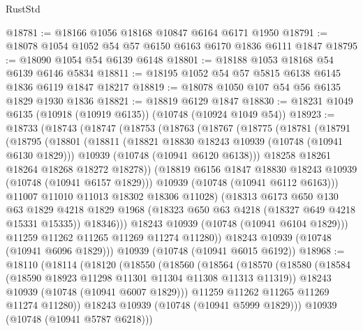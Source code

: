 \begin{lexlean}{RustStd}
\begin{coremodule}
{\begin{coremodule}
{{{{{@18781 := @18166 @1056 @18168 @10847 @6164 @6171 @1950
@18791 := @18078 @1054 @1052 @54 @57 @6150 @6163 @6170 @1836 @6111 @1847
@18795 := @18090 @1054 @54 @6139 @6148
@18801 := @18188 @1053 @18168 @54 @6139 @6146 @5834
@18811 := @18195 @1052 @54 @57 @5815 @6138 @6145 @1836 @6119 @1847 @18217
@18819 := @18078 @1050 @107 @54 @56 @6135 @1829 @1930 @1836
@18821 := @18819 @6129 @1847
@18830 := @18231 @1049 @6135 (@10918 (@10919 @6135)) (@10748 (@10924 @1049 @54))
@18923 := @18733
    (@18743
      (@18747
        (@18753
          (@18763
            (@18767
              (@18775
                (@18781
                  (@18791
                    (@18795
                      (@18801
                        (@18811
                          (@18821 @18830 @18243 @10939 (@10748 (@10941 @6130 @1829)))
                          @10939
                          (@10748 (@10941 @6120 @6138)))
                        @18258
                        @18261
                        @18264
                        @18268
                        @18272
                        @18278))
                    (@18819 @6156 @1847 @18830 @18243 @10939 (@10748 (@10941 @6157 @1829)))
                    @10939
                    (@10748 (@10941 @6112 @6163)))
                  @11007
                  @11010
                  @11013
                  @18302
                  @18306
                  @11028)
                (@18313
                  @6173
                  @650
                  @130
                  @63
                  @1829
                  @4218
                  @1829
                  @1968
                  (@18323 @650 @63 @4218 (@18327 @649 @4218 @15331 @15335))
                  @18346)))
            @18243
            @10939
            (@10748 (@10941 @6104 @1829)))
          @11259
          @11262
          @11265
          @11269
          @11274
          @11280))
      @18243
      @10939
      (@10748 (@10941 @6096 @1829)))
    @10939
    (@10748 (@10941 @6015 @6192))
@18968 := @18110
    (@18114
      (@18120
        (@18550
          (@18560
            (@18564
              (@18570
                (@18580
                  (@18584 (@18590 @18923 @11298 @11301 @11304 @11308 @11313 @11319))
                  @18243
                  @10939
                  (@10748 (@10941 @6007 @1829)))
                @11259
                @11262
                @11265
                @11269
                @11274
                @11280))
            @18243
            @10939
            (@10748 (@10941 @5999 @1829)))
          @10939
          (@10748 (@10941 @5787 @6218)))
}}}}}
\end{coremodule}}
\end{coremodule}
\end{lexlean}
